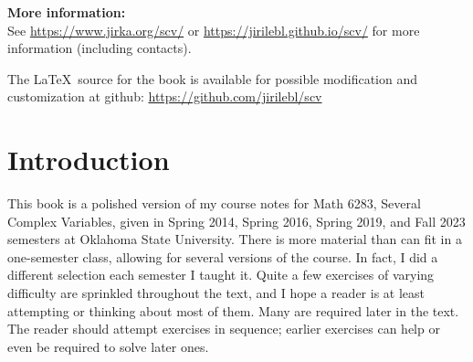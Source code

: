 \documentclass[12pt,openany]{book}
\newcommand{\ignore}[1]{}
\theoremstyle{plain}
\theoremstyle{remark}
\theoremstyle{definition}
\theoremstyle{exercise}
\theoremstyle{example}
\begin{document}
\noindent
\textbf{More information:}
\\
See \url{https://www.jirka.org/scv/} or
\url{https://jirilebl.github.io/scv/}
for more information
(including contacts).


\medskip

\noindent
The \LaTeX\ source for the book is available
for possible modification and customization
at github: \url{https://github.com/jirilebl/scv}




\tableofcontents
{}



\chapter*{Introduction} \label{ch:intro}


This book is a polished version of my course notes for Math 6283, Several
Complex Variables, given in
Spring 2014, Spring 2016, Spring 2019, and Fall 2023 semesters
at Oklahoma State University.
There is more material than can fit in a one-semester class,
allowing for several versions of the course.
In fact, I did a different selection each semester I taught it.
Quite a few exercises of varying difficulty are
sprinkled throughout the text, and I hope a reader is
at least attempting or thinking about most of them.
Many are required later in the text.
The reader should attempt exercises in sequence; earlier exercises
can help or even be required to solve later ones.
\end{document}
